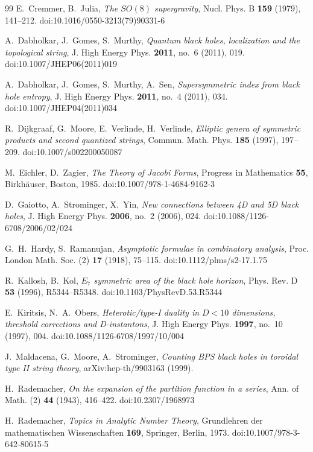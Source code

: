 \documentclass[11pt]{amsart}
\theoremstyle{definition}
\begin{document}
\begin{thebibliography}{99}
 E.~Cremmer, B.~Julia, \emph{The $SO(8)$ supergravity}, Nucl. Phys. B \textbf{159} (1979), 141--212. doi:10.1016/0550-3213(79)90331-6

 A.~Dabholkar, J.~Gomes, S.~Murthy, \emph{Quantum black holes, localization and the topological string}, J. High Energy Phys. \textbf{2011}, no.~6 (2011), 019. doi:10.1007/JHEP06(2011)019

 A.~Dabholkar, J.~Gomes, S.~Murthy, A.~Sen, \emph{Supersymmetric index from black hole entropy}, J. High Energy Phys. \textbf{2011}, no.~4 (2011), 034. doi:10.1007/JHEP04(2011)034

 R.~Dijkgraaf, G.~Moore, E.~Verlinde, H.~Verlinde, \emph{Elliptic genera of symmetric products and second quantized strings}, Commun. Math. Phys. \textbf{185} (1997), 197--209. doi:10.1007/s002200050087

 M.~Eichler, D.~Zagier, \emph{The Theory of Jacobi Forms}, Progress in Mathematics \textbf{55}, Birkh\"auser, Boston, 1985. doi:10.1007/978-1-4684-9162-3

 D.~Gaiotto, A.~Strominger, X.~Yin, \emph{New connections between 4D and 5D black holes}, J. High Energy Phys. \textbf{2006}, no.~2 (2006), 024. doi:10.1088/1126-6708/2006/02/024

 G.~H.~Hardy, S.~Ramanujan, \emph{Asymptotic formulae in combinatory analysis}, Proc. London Math. Soc. (2) \textbf{17} (1918), 75--115. doi:10.1112/plms/s2-17.1.75

 R.~Kallosh, B.~Kol, \emph{$E_7$ symmetric area of the black hole horizon}, Phys. Rev. D \textbf{53} (1996), R5344--R5348. doi:10.1103/PhysRevD.53.R5344

 E.~Kiritsis, N.~A.~Obers, \emph{Heterotic/type-I duality in $D<10$ dimensions, threshold corrections and D-instantons}, J. High Energy Phys. \textbf{1997}, no.~10 (1997), 004. doi:10.1088/1126-6708/1997/10/004

 J.~Maldacena, G.~Moore, A.~Strominger, \emph{Counting BPS black holes in toroidal type II string theory}, arXiv:hep-th/9903163 (1999).

 H.~Rademacher, \emph{On the expansion of the partition function in a series}, Ann. of Math. (2) \textbf{44} (1943), 416--422. doi:10.2307/1968973

 H.~Rademacher, \emph{Topics in Analytic Number Theory}, Grundlehren der mathematischen Wissenschaften \textbf{169}, Springer, Berlin, 1973. doi:10.1007/978-3-642-80615-5


\end{thebibliography}
\end{document}
